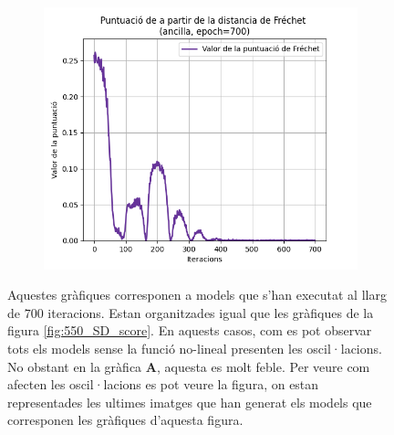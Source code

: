 \begin{figure}
\begin{subfigure}[b]{.32\linewidth}
		\includegraphics[width=\linewidth]{figures/data/FD_score_A6.png}
		\caption{}
	\end{subfigure}
	\label{fig:700_SD_score}
	\caption{Aquestes gràfiques corresponen a models que s'han executat al llarg de $700$ iteracions. Estan organitzades igual que les gràfiques de la figura \ref{fig:550_SD_score}. En aquests casos, com es pot observar tots els models sense la funció no-lineal presenten les oscil·lacions. No obstant en la gràfica \textbf{A}, aquesta es molt feble. Per veure com afecten les oscil·lacions es pot veure la figura, on estan representades les ultimes imatges que han generat els models que corresponen les gràfiques d'aquesta figura.}
	
\end{figure}

